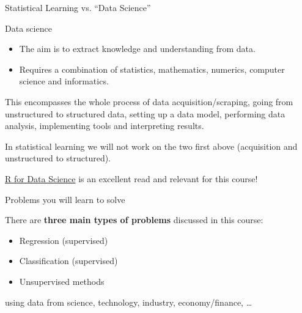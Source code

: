 \documentclass[10pt,ignorenonframetext,]{beamer}
\begin{document}
\begin{frame}{Statistical Learning vs. ``Data Science''}

Data science

\begin{itemize}
\item
  The aim is to extract knowledge and understanding from data.
  \vspace{2mm}
\item
  Requires a combination of statistics, mathematics, numerics, computer
  science and informatics.
\end{itemize}

This encompasses the whole process of data acquisition/scraping, going
from unstructured to structured data, setting up a data model,
performing data analysis, implementing tools and interpreting results.

In statistical learning we will not work on the two first above
(acquisition and unstructured to structured).

\href{http://r4ds.had.co.nz/}{R for Data Science} is an excellent read
and relevant for this course!

\end{frame}

\begin{frame}{Problems you will learn to solve}

There are \textbf{three main types of problems} discussed in this
course:

\begin{itemize}
\item
  Regression (supervised)
\item
  Classification (supervised)
\item
  Unsupervised methods
\end{itemize}

using data from science, technology, industry, economy/finance, \ldots{}

\end{frame}
\end{document}
